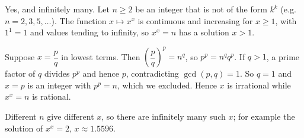 Yes, and infinitely many. Let $n\ge2$ be an integer that is not of the form $k^k$ (e.g. $n=2,3,5,\dots$). The function $x\mapsto x^x$ is continuous and increasing for $x\ge1$, with $1^1=1$ and values tending to infinity, so $x^x=n$ has a solution $x>1$.

Suppose $x=\dfrac pq$ in lowest terms. Then $\left(\dfrac pq\right)^p=n^q$, so $p^p=n^qq^p$. If $q>1$, a prime factor of $q$ divides $p^p$ and hence $p$, contradicting $\gcd(p,q)=1$. So $q=1$ and $x=p$ is an integer with $p^p=n$, which we excluded. Hence $x$ is irrational while $x^x=n$ is rational.

Different $n$ give different $x$, so there are $\boxed{\text{infinitely many}}$ such $x$; for example the solution of $x^x=2$, $x\approx1.5596$.
